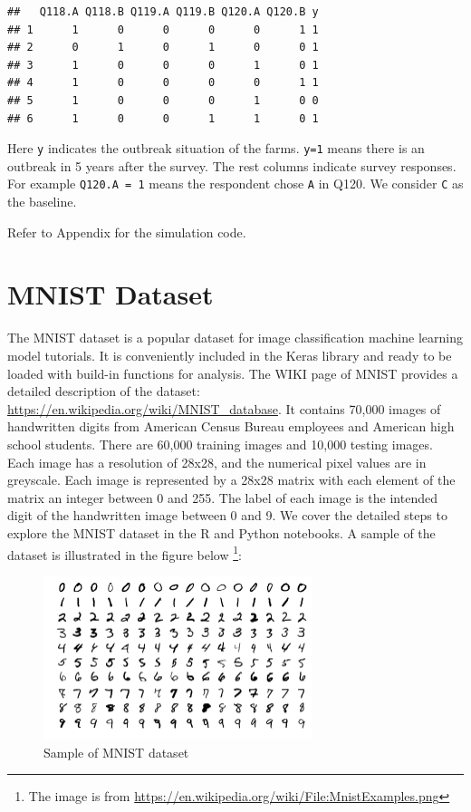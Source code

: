 \documentclass[12pt,]{krantz}
\begin{document}
\begin{verbatim}
##   Q118.A Q118.B Q119.A Q119.B Q120.A Q120.B y
## 1      1      0      0      0      0      1 1
## 2      0      1      0      1      0      0 1
## 3      1      0      0      0      1      0 1
## 4      1      0      0      0      0      1 1
## 5      1      0      0      0      1      0 0
## 6      1      0      0      1      1      0 1
\end{verbatim}

Here \texttt{y} indicates the outbreak situation of the farms. \texttt{y=1} means there is an outbreak in 5 years after the survey. The rest columns indicate survey responses. For example \texttt{Q120.A\ =\ 1} means the respondent chose \texttt{A} in Q120. We consider \texttt{C} as the baseline.

Refer to Appendix for the simulation code.

\hypertarget{mnist-dataset}{%
\section{MNIST Dataset}\label{mnist-dataset}}

The MNIST dataset is a popular dataset for image classification machine learning model tutorials. It is conveniently included in the Keras library and ready to be loaded with build-in functions for analysis. The WIKI page of MNIST provides a detailed description of the dataset: \url{https://en.wikipedia.org/wiki/MNIST_database}. It contains 70,000 images of handwritten digits from American Census Bureau employees and American high school students. There are 60,000 training images and 10,000 testing images. Each image has a resolution of 28x28, and the numerical pixel values are in greyscale. Each image is represented by a 28x28 matrix with each element of the matrix an integer between 0 and 255. The label of each image is the intended digit of the handwritten image between 0 and 9. We cover the detailed steps to explore the MNIST dataset in the R and Python notebooks. A sample of the dataset is illustrated in the figure below \footnote{The image is from \url{https://en.wikipedia.org/wiki/File:MnistExamples.png}}:

\begin{figure}
\centering
\includegraphics[width=0.7\textwidth,height=\textheight]{images/MnistExamples.png}
\caption{Sample of MNIST dataset}
\end{figure}
\end{document}
